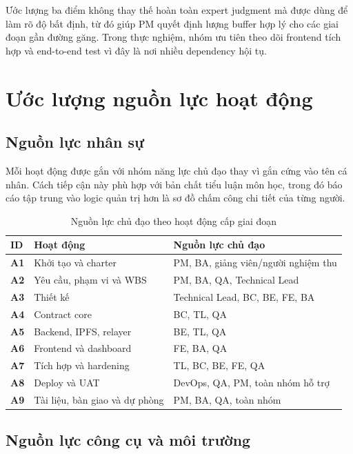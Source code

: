 Ước lượng ba điểm không thay thế hoàn toàn expert judgment mà được dùng để làm rõ độ bất định, từ đó giúp PM quyết định lượng buffer hợp lý cho các giai đoạn gần đường găng. Trong thực nghiệm, nhóm ưu tiên theo dõi frontend tích hợp và end-to-end test vì đây là nơi nhiều dependency hội tụ.

\iffalse
\section{Ước lượng nguồn lực hoạt động}

\subsection{Nguồn lực nhân sự}

Mỗi hoạt động được gắn với nhóm năng lực chủ đạo thay vì gắn cứng vào tên cá nhân. Cách tiếp cận này phù hợp với bản chất tiểu luận môn học, trong đó báo cáo tập trung vào logic quản trị hơn là sơ đồ chấm công chi tiết của từng người.

\begin{table}[H]
\centering
\caption{Nguồn lực chủ đạo theo hoạt động cấp giai đoạn}
\label{tab:activity-resources}
\begin{tabularx}{\textwidth}{| >{\bfseries}p{1.1cm} | p{4.1cm} | X |}
\hline
ID & Hoạt động & Nguồn lực chủ đạo \\
\hline
A1 & Khởi tạo và charter & PM, BA, giảng viên/người nghiệm thu \\ \hline
A2 & Yêu cầu, phạm vi và WBS & PM, BA, QA, Technical Lead \\ \hline
A3 & Thiết kế & Technical Lead, BC, BE, FE, BA \\ \hline
A4 & Contract core & BC, TL, QA \\ \hline
A5 & Backend, IPFS, relayer & BE, TL, QA \\ \hline
A6 & Frontend và dashboard & FE, BA, QA \\ \hline
A7 & Tích hợp và hardening & TL, BC, BE, FE, QA \\ \hline
A8 & Deploy và UAT & DevOps, QA, PM, toàn nhóm hỗ trợ \\ \hline
A9 & Tài liệu, bàn giao và dự phòng & PM, BA, QA, toàn nhóm \\
\hline
\end{tabularx}
\end{table}

\subsection{Nguồn lực công cụ và môi trường}

